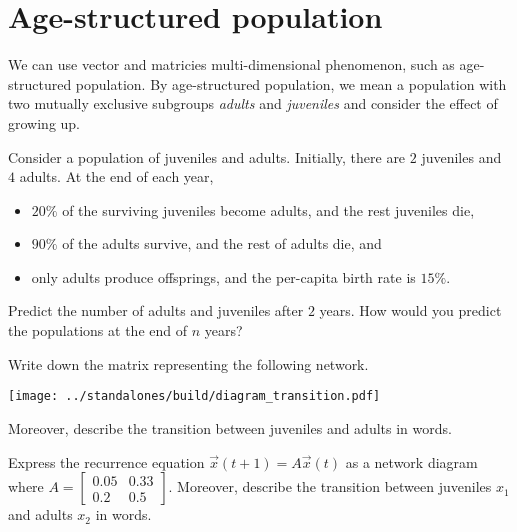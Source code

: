\documentclass[../main.tex]{subfiles}
\begin{document}
 \section{Age-structured population}

We can use vector and matricies multi-dimensional phenomenon, such as age-structured population.  By age-structured population, we mean a population with two mutually exclusive subgroups \emph{adults} and \emph{juveniles} and consider the effect of growing up.

\begin{example}
  Consider a population of juveniles and adults. Initially, there are \(2\) juveniles and \(4\) adults. At the end of each year, 
  \begin{itemize}[itemsep={0ex}]
    \item \(20\%\) of the surviving juveniles become adults, and the rest juveniles die, 
    \item \(90\%\) of the adults survive, and the rest of adults die, and
    \item only adults produce offsprings, and the per-capita birth rate is \(15\%\). 
  \end{itemize}

  Predict the number of adults and juveniles after \(2\) years.  How would you predict the populations at the end of \(n\) years?

  \clearpage
\end{example}
\clearpage

\begin{example}
  Write down the matrix representing the following network.

  \begin{center}
    \texttt{[image: ../standalones/build/diagram\_transition.pdf]}
  \end{center}

  Moreover, describe the transition between juveniles and adults in words.

\end{example}

\begin{example}
  Express the recurrence equation \(\vec{x}(t+1) = A \vec{x}(t)\) as a network diagram where \(A = \begin{bmatrix} 0.05 & 0.33 \\ 0.2 & 0.5 \end{bmatrix}\). Moreover, describe the transition between juveniles \(x_{1}\) and adults \(x_{2}\) in words.

\end{example}
\end{document}

